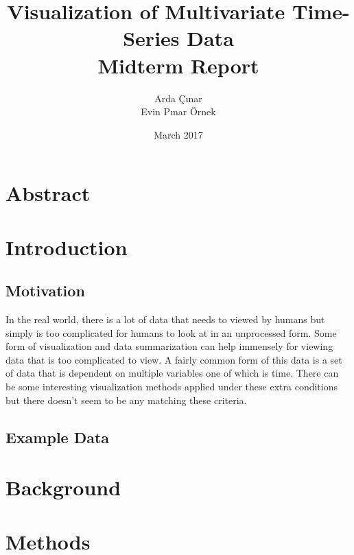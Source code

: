 \documentclass[11pt]{article}
\title{Visualization of Multivariate Time-Series Data \\ Midterm Report}
\author{Arda Çınar \\ Evin Pınar Örnek}
\date{March 2017}
\begin{document}
\maketitle

\section{Abstract} 


\section{Introduction}

\subsection{Motivation}

In the real world, there is a lot of data that needs to viewed by humans but simply is too complicated for humans to look at in an unprocessed form. Some form of visualization and data summarization can help immensely for viewing data that is too complicated to view. A fairly common form of this data is a set of data that is dependent on multiple variables one of which is time. There can be some interesting visualization methods applied under these extra conditions but there doesn't seem to be any matching these criteria.

\subsection{Example Data}

\section{Background}


\section{Methods}

\end{document}
